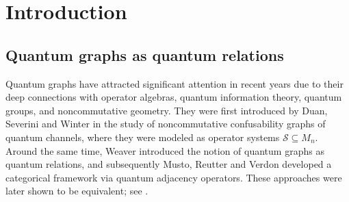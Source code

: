 \documentclass[11pt]{amsart}
\numberwithin{equation}{section}
\theoremstyle{plain}
\theoremstyle{definition}
\theoremstyle{remark}
\renewcommand{\S}{{\mathcal{S}}}
\begin{document}
\begin{abstract}
We introduce an operator-algebraic framework for Morita equivalence of quantum graphs based on $\Delta$-equivalence of operator systems introduced by Eleftherakis, Kakariadis and Todorov. Adopting the perspective of Weaver, we view quantum graphs as quantum relations, that is, operator systems endowed with a bimodule structure over the commutant of a von Neumann algebra. Within this framework, we show that two irreducibly acting quantum graphs are Morita equivalent if and only if they are both full pullbacks of a common quantum graph. This extends a result of Eleftherakis, Kakariadis and Todorov for graph operator systems to the quantum graph setting. In passing we construct a true-twin reduction analogue for an irreducibly acting quantum graph. We further characterise the case where we have simultaneous TRO-equivalence of the quantum graphs and their associated algebras, thus giving a second, stronger notion of Morita equivalence.
In the special case of noncommutative graphs, corresponding to the zero-error quantum communication setting, 
the two notions coincide and we obtain a characterisation in terms of strong co-homomorphisms of noncommutative graphs. Finally, we show that connectivity, the independence number, Shannon capacity, quantum complexity and subcomplexity, Haemers bound, and the Lov\'asz number are invariant under Morita equivalence. 
\end{abstract}


\maketitle


\section{Introduction}
\subsection{Quantum graphs as quantum relations}
Quantum graphs have attracted significant attention in recent years due to their deep connections with operator algebras, quantum information theory, quantum groups, and noncommutative geometry. They were first introduced by Duan, Severini and Winter \cite{DSW13} in the study of noncommutative confusability graphs of quantum channels, where they were modeled as operator systems $\S \subseteq M_n$. Around the same time, Weaver \cite{Wea12} introduced the notion of quantum graphs as quantum relations, and subsequently Musto, Reutter and Verdon \cite{MRV18} developed a categorical framework via quantum adjacency operators.  These approaches were later shown to be equivalent; see \cite{Daws24, Was24}.
\end{document}
